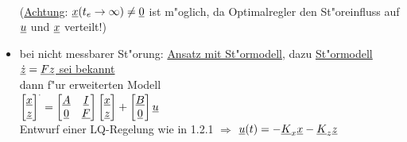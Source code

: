 \documentclass[openany,a4paper,11pt]{book}
\begin{document}
\begin{itemize}
\begin{tikzpicture}[auto, node distance=2cm, >=triangle 45]
    \end{tikzpicture}\\
    (\uline{Achtung}: $\uline{x}(t_e\rightarrow\infty)\neq\uline{0}$ ist m"oglich, da Optimalregler den St"oreinfluss auf $\uline{u}$ und $\uline{x}$ verteilt!)
    \item bei nicht messbarer St"orung: \uline{Ansatz mit St"ormodell}, dazu \uline{St"ormodell $\uline{\dot{z}}=\uline{Fz}$ sei bekannt}\\
    dann f"ur erweiterten Modell\\[2pt]
    $\begin{bmatrix} \uline{x}\\\uline{z}\end{bmatrix}^{\cdot} = 
    \begin{bmatrix} \uline{A} & \uline{I}\\\uline{0} & \uline{F}\end{bmatrix} \begin{bmatrix} \uline{x}\\ \uline{z} \end{bmatrix}+ \begin{bmatrix} \uline{B}\\ \uline{0} \end{bmatrix}\uline{u}$\\[2pt]
    Entwurf einer LQ-Regelung wie in 1.2.1 $\Rightarrow$ $\uline{u}(t)=-\uline{K}_x\uline{x}-\uline{K}_z\uline{z}$
\end{itemize}
\clearpage
\end{document}
